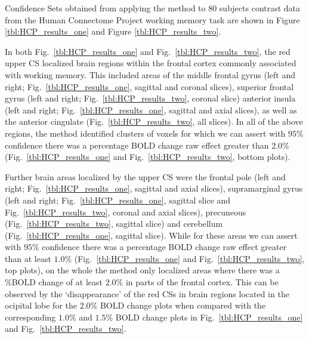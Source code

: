 Confidence Sets obtained from applying the method to 80 subjects contrast data from the Human Connectome Project working memory task are shown in Figure \ref{tbl:HCP_results_one} and Figure \ref{tbl:HCP_results_two}.

In both Fig.\ \ref{tbl:HCP_results_one} and Fig.\ \ref{tbl:HCP_results_two}, the red upper CS localized brain regions within the frontal cortex commonly associated with working memory. This included areas of the middle frontal gyrus (left and right; Fig.\ \ref{tbl:HCP_results_one}, sagittal and coronal slices), superior frontal gyrus (left and right; Fig.\ \ref{tbl:HCP_results_two}, coronal slice) anterior insula (left and right; Fig.\ \ref{tbl:HCP_results_one}, sagittal and axial slices), as well as the anterior cingulate (Fig.\ \ref{tbl:HCP_results_two}, all slices). In all of the above regions, the method identified clusters of voxels for which we can assert with $95\%$ confidence there was a percentage BOLD change raw effect greater than $2.0\%$ (Fig.\ \ref{tbl:HCP_results_one} and Fig.\ \ref{tbl:HCP_results_two}, bottom plots). 

Further brain areas localized by the upper CS were the frontal pole (left and right; Fig.\ \ref{tbl:HCP_results_one}, sagittal and axial slices), supramarginal gyrus (left and right; Fig.\ \ref{tbl:HCP_results_one}, sagittal slice and Fig.\ \ref{tbl:HCP_results_two}, coronal and axial slices), precuneous (Fig.\ \ref{tbl:HCP_results_two}, sagittal slice) and cerebellum (Fig.\ \ref{tbl:HCP_results_one}, sagittal slice). While for these areas we can assert with $95\%$ confidence there was a percentage BOLD change raw effect greater than at least $1.0\%$ (Fig.\ \ref{tbl:HCP_results_one} and Fig.\ \ref{tbl:HCP_results_two}, top plots), on the whole the method only localized areas where there was a \%BOLD change of at least $2.0\%$ in parts of the frontal cortex. This can be observed by the `disappearance' of the red CSs in brain regions located in the ocipital lobe for the $2.0\%$ BOLD change plots when compared with the corresponding $1.0\%$ and $1.5\%$ BOLD change plots in Fig.\ \ref{tbl:HCP_results_one} and Fig.\ \ref{tbl:HCP_results_two}. 

